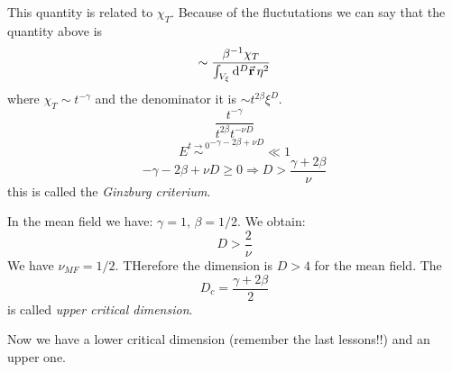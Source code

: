 \documentclass[../main/main.tex]{subfiles}
\begin{document}
This quantity is related to \( \chi _T \). Because of the fluctutations we can say that the quantity above is
\begin{equation}
  \sim  \frac{\beta ^{-1} \chi _T }{ \int_{V_ \xi }^{} \dd[D]{\va{r}} \eta ^2 }
\end{equation}
where \( \chi _T \sim t^{-\gamma  } \) and  the denominator it is \(  \sim t^{2 \beta } \xi ^D\).
\begin{equation}
  \frac{t^{-\gamma  }}{t^{2 \beta } t^{-\nu D}}
\end{equation}
\begin{equation}
  E \overset{t \rightarrow 0}{\sim } ^{-\gamma -2 \beta + \nu D } \ll 1
\end{equation}
\begin{equation}
  - \gamma - 2 \beta + \nu D \ge 0 \Rightarrow D > \frac{\gamma + 2 \beta  }{\nu }
\end{equation}
this is called the \emph{Ginzburg criterium}.

In the mean field we have: \( \gamma =1  \), \( \beta = 1/2 \). We obtain:
\begin{equation}
  D > \frac{2}{\nu }
\end{equation}
We have \( \nu _{MF} = 1/2 \). THerefore the dimension is \( D>4 \) for the mean field.
The
\begin{equation}
  D_c = \frac{\gamma + 2 \beta  }{2}
\end{equation}
is called \emph{upper critical dimension}.

Now we have a lower critical dimension (remember the last lessons!!) and an upper one.
\end{document}
